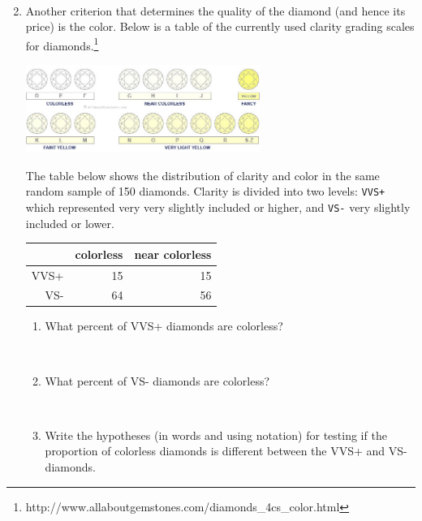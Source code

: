 \documentclass[11pt]{article}
\newcommand{\soln}[2]{$\:$\\ \vspace{#1}}{}
\begin{document}
\begin{enumerate}
\begin{enumerate}
\soln{3cm}{
We are 90\% confident that roughly 1.3\% to 6\% of all diamonds are internally flawless (based on the percentile method).
}

\end{enumerate}


\pagebreak

\item Another criterion that determines the quality of the diamond (and hence its price) is the color. Below is a table of the 
currently used clarity grading scales for diamonds.\footnote{http://www.allaboutgemstones.com/diamonds\_4cs\_color.html} 
\begin{center}
\includegraphics[width=0.6\textwidth]{figures/diamond/diamond_color} 
\end{center}
The table below shows the distribution of clarity and color in the same random sample of 150 diamonds. Clarity is divided 
into two levels: \texttt{VVS+} which represented very very slightly included or higher, and \texttt{VS-} very slightly included 
or lower.

\begin{center}
\begin{tabular}{rrr}
  \hline
 & colorless & near colorless \\ 
  \hline
VVS+ &   15 &  15 \\ 
  VS- &  64 &  56 \\ 
   \hline
\end{tabular}
\end{center}

\begin{enumerate}

\item What percent of VVS+ diamonds are colorless?

\soln{1cm}{$15 / (15 + 15) = 0.5$}

\item What percent of VS- diamonds are colorless?

\soln{1cm}{$64 / (64 + 56) = 0.533$}

\item Write the hypotheses (in words and using notation) for testing if the proportion of colorless diamonds is different 
between the VVS+ and VS- diamonds.


\end{enumerate}
\end{enumerate}
\end{document}
